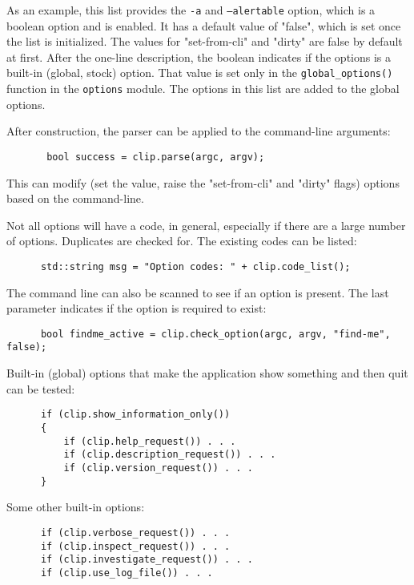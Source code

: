    As an example, this list provides the \texttt{-a} and \texttt{--alertable}
   option, which is a boolean option and is enabled. It has a default value
   of "false", which is set once the list is initialized.
   The values for "set-from-cli" and "dirty" are false by default at first.
   After the one-line description, the boolean indicates if the options
   is a built-in (global, stock) option. 
   That value is set only in the \texttt{global\_options()} function
   in the \texttt{options} module.
   The options in this list are added to the global options.

   After construction, the parser can be applied to the command-line
   arguments:

   \begin{verbatim}
       bool success = clip.parse(argc, argv);
   \end{verbatim}

   This can modify (set the value, raise the "set-from-cli" and "dirty"
   flags) options based on the command-line.

   Not all options will have a code, in general, especially if there are a
   large number of options. Duplicates are checked for.
   The existing codes can be listed:

   \begin{verbatim}
      std::string msg = "Option codes: " + clip.code_list();
   \end{verbatim}

   The command line can also be scanned to see if an option is present.
   The last parameter indicates if the option is required to exist:

   \begin{verbatim}
      bool findme_active = clip.check_option(argc, argv, "find-me", false);
   \end{verbatim}

   Built-in (global) options that make the application show something and
   then quit can be tested:

   \begin{verbatim}
      if (clip.show_information_only())
      {
          if (clip.help_request()) . . .
          if (clip.description_request()) . . .
          if (clip.version_request()) . . .
      }
   \end{verbatim}

   Some other built-in options:

   \begin{verbatim}
      if (clip.verbose_request()) . . .
      if (clip.inspect_request()) . . .
      if (clip.investigate_request()) . . .
      if (clip.use_log_file()) . . .
   \end{verbatim}

